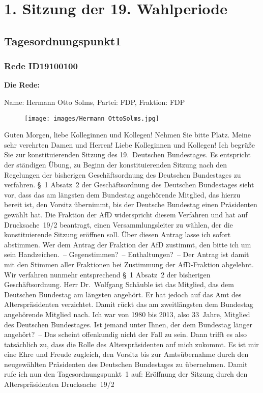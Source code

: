 \documentclass[10pt, a4paper]{report}
\begin{document}
\tableofcontents

\chapter{1. Sitzung der 19. Wahlperiode}
\thispagestyle{empty}

\section{Tagesordnungspunkt1}
\subsection{Rede ID19100100}

\textbf{Die Rede:}

Name: Hermann Otto Solms, Partei: FDP, Fraktion: FDP

\begin{figure}[!ht]
\texttt{[image: images/Hermann OttoSolms.jpg]}
\end{figure}


Guten Morgen, liebe Kolleginnen und Kollegen! Nehmen Sie bitte Platz. Meine sehr verehrten Damen und Herren! Liebe Kolleginnen und Kollegen! Ich begrüße Sie zur konstituierenden Sitzung des 19. Deutschen Bundestages. Es entspricht der ständigen Übung, zu Beginn der konstituierenden Sitzung nach den Regelungen der bisherigen Geschäftsordnung des Deutschen Bundestages zu verfahren. § 1 Absatz 2 der Geschäftsordnung des Deutschen Bundestages sieht vor, dass das am längsten dem Bundestag angehörende Mitglied, das hierzu bereit ist, den Vorsitz übernimmt, bis der Deutsche Bundestag einen Präsidenten gewählt hat. Die Fraktion der AfD widerspricht diesem Verfahren und hat auf Drucksache 19/2 beantragt, einen Versammlungsleiter zu wählen, der die konstituierende Sitzung eröffnen soll. Über diesen Antrag lasse ich sofort abstimmen. Wer dem Antrag der Fraktion der AfD zustimmt, den bitte ich um sein Handzeichen. – Gegenstimmen? – Enthaltungen? – Der Antrag ist damit mit den Stimmen aller Fraktionen bei Zustimmung der AfD-Fraktion abgelehnt. Wir verfahren nunmehr entsprechend § 1 Absatz 2 der bisherigen Geschäftsordnung. Herr Dr. Wolfgang Schäuble ist das Mitglied, das dem Deutschen Bundestag am längsten angehört. Er hat jedoch auf das Amt des Alterspräsidenten verzichtet. Damit rückt das am zweitlängsten dem Bundestag angehörende Mitglied nach. Ich war von 1980 bis 2013, also 33 Jahre, Mitglied des Deutschen Bundestages. Ist jemand unter Ihnen, der dem Bundestag länger angehört? – Das scheint offenkundig nicht der Fall zu sein. Dann trifft es also tatsächlich zu, dass die Rolle des Alterspräsidenten auf mich zukommt. Es ist mir eine Ehre und Freude zugleich, den Vorsitz bis zur Amtsübernahme durch den neugewählten Präsidenten des Deutschen Bundestages zu übernehmen. Damit rufe ich nun den Tagesordnungspunkt 1 auf: Eröffnung der Sitzung durch den Alterspräsidenten Drucksache 19/2 
\end{document}
